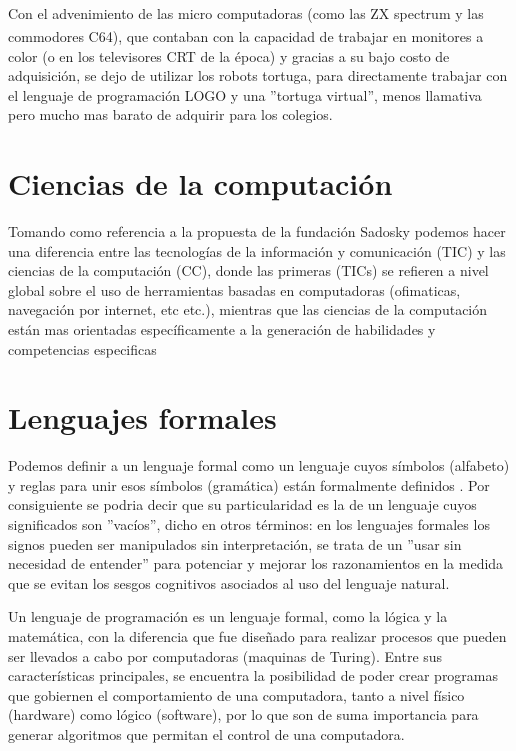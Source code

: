 Con el advenimiento de las micro computadoras (como las ZX spectrum\textsuperscript{\texttrademark}  y las commodores\textsuperscript{\texttrademark} C64), que contaban con la capacidad de trabajar  en monitores a color (o en los televisores CRT de la época) y gracias a su bajo costo de adquisición, se dejo de utilizar los robots tortuga, para directamente trabajar con el lenguaje de programación LOGO y una ''tortuga virtual'', menos llamativa pero mucho mas barato de adquirir para los colegios.

\section{Ciencias de la computación}

Tomando como referencia a la propuesta de la fundación Sadosky \citep{sadosky2013cc} podemos hacer una diferencia entre las  tecnologías de la  información y comunicación (TIC) y las ciencias de la computación (CC), donde las primeras (TICs) se refieren a nivel global sobre el uso de herramientas basadas en computadoras (ofimaticas, navegación por internet, etc etc.), mientras que las ciencias de la computación están mas orientadas específicamente a la generación de habilidades y competencias especificas 

\section{Lenguajes formales}

Podemos definir a un lenguaje formal como un lenguaje cuyos símbolos (alfabeto) y reglas para unir esos símbolos (gramática) están formalmente definidos \citep{giro_lenguaje_2015}. Por consiguiente se podria decir que su particularidad  es la de un lenguaje cuyos significados son ''vacíos'', dicho en otros términos: en los lenguajes formales los signos pueden ser manipulados sin interpretación, se trata de un ''usar sin necesidad de entender'' para potenciar y mejorar los razonamientos en la medida que se evitan los sesgos cognitivos asociados al uso del lenguaje natural.

Un lenguaje de programación es un lenguaje formal, como la lógica y la matemática, con la diferencia que fue diseñado para realizar procesos que pueden ser llevados a cabo por computadoras (maquinas de Turing). Entre sus características principales, se encuentra la posibilidad de poder crear programas que gobiernen el comportamiento de una computadora, tanto a nivel físico (hardware) como lógico (software), por lo que son de suma importancia para generar algoritmos que permitan el control de una computadora.

